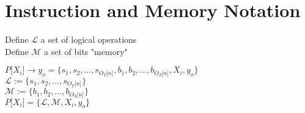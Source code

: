 \documentclass[11pt]{article}
\begin{document}





\section{Instruction and Memory Notation}
Define $\mathcal{L}$ a set of logical operations\\
Define $\mathcal{M}$ a set of bits "memory"
\begin{center}
$
P \lbrack X_i \rbrack \rightarrow y_o = \{ s_1,s_2,...,s_{O_T \lbrack n \rbrack }, b_1, b_2,...,b_{O_S \lbrack n \rbrack},X_i,y_o \}
$
\\ \vspace{2mm}
$
\mathcal{L} := \{ s_1,s_2,...,s_{O_T \lbrack n \rbrack}\}
$
\\ \vspace{2mm}
$
\mathcal{M} := \{ b_1,b_2,...,b_{O_S \lbrack n \rbrack}\}
$
\\ \vspace{2mm}
$
P \lbrack X_i \rbrack = \{ \mathcal{L},\mathcal{M},X_i,y_o\}
$
\end{center}
\end{document}
